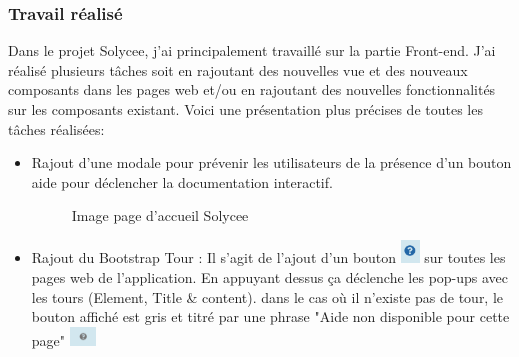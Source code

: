 \documentclass[a4paper]{article}
\begin{document}
\subsubsection{Travail réalisé}

Dans le projet Solycee, j'ai principalement travaillé sur la partie Front-end. J'ai réalisé plusieurs tâches soit en rajoutant des nouvelles vue et des nouveaux composants dans les pages web et/ou en rajoutant des nouvelles fonctionnalités sur les composants existant. Voici une présentation plus précises de toutes les tâches réalisées: 

\begin{itemize}
\item Rajout d'une modale pour prévenir les utilisateurs de la  présence d'un bouton aide pour déclencher la documentation interactif.

\begin{figure}[H]
	\centering
  		\caption{Image page d'accueil Solycee}
	\end{figure}
   
\item Rajout du Bootstrap Tour : Il s'agit de l'ajout d'un bouton \includegraphics[width=5mm,scale=0.5]{diagrammes/Bouton_aideDispo.png} sur toutes les pages web de l'application. En appuyant dessus ça déclenche les pop-ups avec les tours (Element, Title \& content). dans le cas où il n'existe pas de tour, le bouton affiché est gris et titré par une phrase "Aide non disponible pour cette page" \includegraphics[width=7mm,scale=0.5]{diagrammes/Bouton_aideNonDispo.png}  


\end{itemize}
\end{document}

